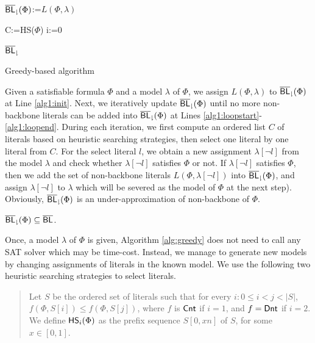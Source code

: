 \begin{algorithm}
\SetAlgoShortEnd
\SetFillComment
{}
${\sf \overline{BL}_\downharpoonright}(\Phi)$:=$L(\Phi,\lambda)$\; \label{alg1:init}
    {
    C:={\sf HS}($\Phi$)\;
    i:=0\;

}\label{alg1:loopend}
\Return ${\sf \overline{BL}_\downharpoonright}$\;
\caption{Greedy-based algorithm}
\label{alg:greedy}
\end{algorithm}
Given a satisfiable formula $\Phi$ and a model $\lambda$ of $\Phi$,
we assign $L(\Phi,\lambda)$ to ${\sf \overline{BL}_\downharpoonright}(\Phi)$ at Line \ref{alg1:init}. Next, we iteratively update
${\sf \overline{BL}_\downharpoonright}(\Phi)$ until no more non-backbone literals can be added into ${\sf \overline{BL}_\downharpoonright}(\Phi)$ at Lines \ref{alg1:loopstart}-\ref{alg1:loopend}.
During each iteration, we first compute an ordered list $C$ of literals based on heuristic searching strategies, then select one literal  by one literal from
$C$. For the select literal $l$, we obtain a new assignment $\lambda[\neg l]$ from the model
$\lambda$ and check whether  $\lambda[\neg l]$ satisfies $\Phi$ or not.
If $\lambda[\neg l]$ satisfies $\Phi$, then we add the set of non-backbone literals $L(\Phi,\lambda[\neg l])$ into ${\sf \overline{BL}_\downharpoonright}(\Phi)$, and
assign $\lambda[\neg l]$ to $\lambda$ which will be severed as the model of $\Phi$ at the next step).
Obviously,  ${\sf \overline{BL}_\downharpoonright}(\Phi)$ is an under-approximation of non-backbone of $\Phi$.

\begin{theorem}
${\sf \overline{BL}_\downharpoonright}(\Phi)\subseteq\overline{\textsf{BL}}$.
\end{theorem}

Once, a model $\lambda$ of $\Phi$ is given, Algorithm \ref{alg:greedy} does not need to call any SAT solver which may be time-cost.
Instead, we manage to generate new models by changing assignments of literals in the known model.
We use the following two heuristic searching strategies to select literals. %
\begin{quote}
Let $S$ be the ordered set of literals such that for every $i: 0\leq i<j<|S|$,
$f(\Phi,S[i])\leq f(\Phi,S[j])$, where $f$ is $\textsf{Cnt}$ if $i=1$, and $f=\textsf{Dnt}$ if $i=2$.
We define ${\sf HS}_i(\Phi)$ as the prefix sequence $S[0,xn]$ of $S$, for some $x\in[0,1]$.
\end{quote}
 
